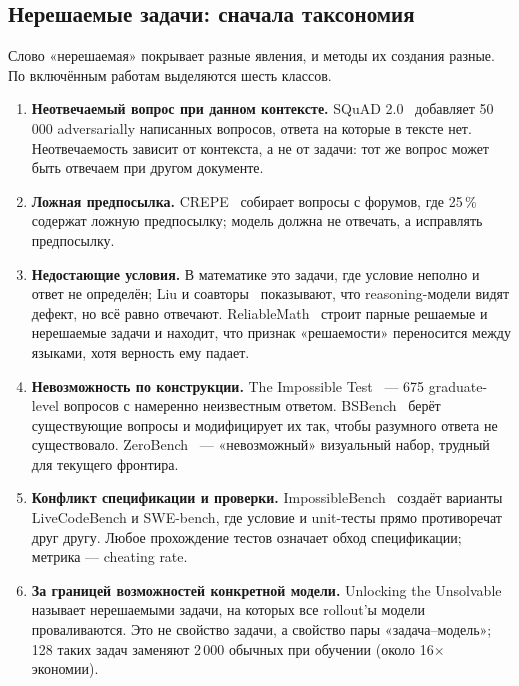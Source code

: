 \documentclass[11pt,a4paper]{article}
\begin{document}
\subsection{Нерешаемые задачи: сначала таксономия}

Слово «нерешаемая» покрывает разные явления, и методы их создания разные.
По включённым работам выделяются шесть классов.

\begin{enumerate}
  \item \textbf{Неотвечаемый вопрос при данном контексте.} SQuAD
        2.0~\cite{squad2_2018} добавляет 50\,000 adversarially написанных
        вопросов, ответа на которые в тексте нет. Неотвечаемость зависит от
        контекста, а не от задачи: тот же вопрос может быть отвечаем при
        другом документе.
  \item \textbf{Ложная предпосылка.} CREPE~\cite{crepe2022} собирает вопросы
        с форумов, где 25\,\% содержат ложную предпосылку; модель должна не
        отвечать, а исправлять предпосылку.
  \item \textbf{Недостающие условия.} В математике это задачи, где условие
        неполно и ответ не определён; Liu и соавторы~\cite{answering_unanswerable2025}
        показывают, что reasoning-модели видят дефект, но всё равно
        отвечают. ReliableMath~\cite{reliablemath2026} строит парные
        решаемые и нерешаемые задачи и находит, что признак
        «решаемости» переносится между языками, хотя верность ему падает.
  \item \textbf{Невозможность по конструкции.} The Impossible
        Test~\cite{impossible_test2024} — 675 graduate-level вопросов с
        намеренно неизвестным ответом. BSBench~\cite{bsbench2025} берёт
        существующие вопросы и модифицирует их так, чтобы разумного ответа
        не существовало. ZeroBench~\cite{zerobench2025} — «невозможный»
        визуальный набор, трудный для текущего фронтира.
  \item \textbf{Конфликт спецификации и проверки.} ImpossibleBench~\cite{impossiblebench2025}
        создаёт варианты LiveCodeBench и SWE-bench, где условие и unit-тесты
        прямо противоречат друг другу. Любое прохождение тестов означает
        обход спецификации; метрика — cheating rate.
  \item \textbf{За границей возможностей конкретной модели.} Unlocking the
        Unsolvable~\cite{unlocking_unsolvable2026} называет нерешаемыми
        задачи, на которых все rollout'ы модели проваливаются. Это не
        свойство задачи, а свойство пары «задача--модель»; 128 таких задач
        заменяют 2\,000 обычных при обучении (около 16$\times$ экономии).
\end{enumerate}
\end{document}
